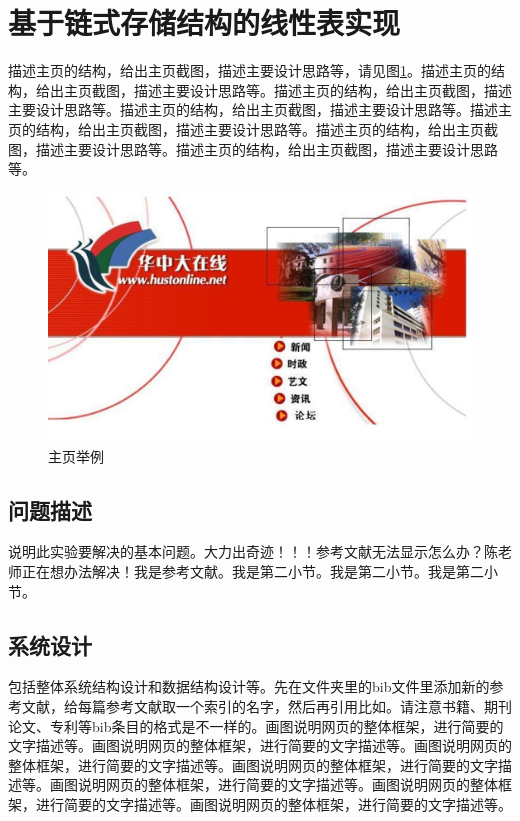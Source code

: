 \documentclass[supercite]{HustGraduPaper}
\theoremstyle{definition}
\begin{document}
    \section{基于链式存储结构的线性表实现}

    描述主页的结构，给出主页截图，描述主要设计思路等，请见图\ref{fig2-1}。描述主页的结构，给出主页截图，描述主要设计思路等。描述主页的结构，给出主页截图，描述主要设计思路等。描述主页的结构，给出主页截图，描述主要设计思路等。描述主页的结构，给出主页截图，描述主要设计思路等。描述主页的结构，给出主页截图，描述主要设计思路等。描述主页的结构，给出主页截图，描述主要设计思路等。

    \begin{figure}[htb]
        \begin{center}
            \includegraphics[scale=0.40]{images/2-1.jpg}
            \caption{主页举例}
            \label{fig2-1}
        \end{center}
    \end{figure}

    \subsection{问题描述}

    说明此实验要解决的基本问题。大力出奇迹！！！参考文献无法显示怎么办？陈老师正在想办法解决\cite{STR2021Neurocom, AVS2021Neurocom}！我是参考文献。我是第二小节\cite{Mehrabian1974An}。我是第二小节\cite{Rezaei2014CVPR}。我是第二小节\cite{Ramnath2008IJCV}。

    \subsection{系统设计}

    包括整体系统结构设计和数据结构设计等。先在文件夹里的bib文件里添加新的参考文献，给每篇参考文献取一个索引的名字，然后再引用比如\cite{STR2021Neurocom}\cite{AVS2021Neurocom, Rezaei2014CVPR}。请注意书籍、期刊论文、专利等bib条目的格式是不一样的。画图说明网页的整体框架，进行简要的文字描述等。画图说明网页的整体框架，进行简要的文字描述等。画图说明网页的整体框架，进行简要的文字描述等。画图说明网页的整体框架，进行简要的文字描述等。画图说明网页的整体框架，进行简要的文字描述等。画图说明网页的整体框架，进行简要的文字描述等。画图说明网页的整体框架，进行简要的文字描述等。
\end{document}
